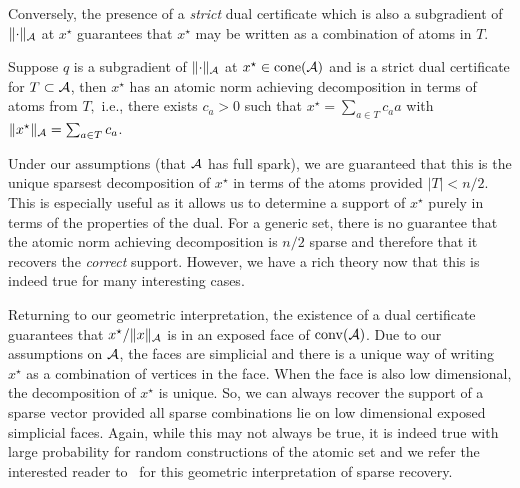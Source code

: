 Conversely, the presence of a \emph{strict} dual certificate which is also a
subgradient of $\lVert\cdot\rVert_{\mathcal{A}}$ at $x^\star$ guarantees that $x^\star$ may be
written as a combination of atoms in $T.$ 

\begin{prop}\label{prop:certificate-support}
Suppose $q$ is a subgradient of $\lVert\cdot\rVert_{\mathcal{A}}$ at $x^\star \in \operatorname{cone}(\mathcal{A})$
and is a strict dual certificate for $T \subset \mathcal{A}$, then $x^\star$ has an
atomic norm achieving decomposition in terms of atoms from $T,$ i.e., there
exists $c_a > 0$ such that $x^\star = \sum_{a \in T}c_a a$ with
$\lVert x^\star\rVert_{\mathcal{A}} = \sum_{a \in T}c_a$.
\end{prop}

Under our assumptions (that $\mathcal{A}$ has full spark), we are guaranteed that this is
the unique sparsest decomposition of $x^\star$ in terms of the atoms provided
$|T| < n/2$. This is especially useful as it allows us to determine a support of
$x^\star$ purely in terms of the properties of the dual. For a generic set,
there is no guarantee that the atomic norm achieving decomposition is $n/2$
sparse and therefore that it recovers the \emph{correct} support. However, we
have a rich theory now that this is indeed true for many interesting
cases\cite{donoho2006most,candes06,candes2005decoding}.

Returning to our geometric interpretation, the existence of a dual certificate
guarantees that $x^\star/\lVert x\rVert_{\mathcal{A}}$ is in an exposed face of $\operatorname{conv}(\mathcal{A})$. Due
to our assumptions on $\mathcal{A}$, the faces are simplicial and there is a unique way
of writing $x^\star$ as a combination of vertices in the face. When the face is
also low dimensional, the decomposition of $x^\star$ is unique. So, we can
always recover the support of a sparse vector provided all sparse combinations
lie on low dimensional exposed simplicial faces. Again, while this may not
always be true, it is indeed true with large probability for random
constructions of the atomic set and we refer the interested reader
to~\cite{neighborliness} for this geometric interpretation of sparse recovery.

